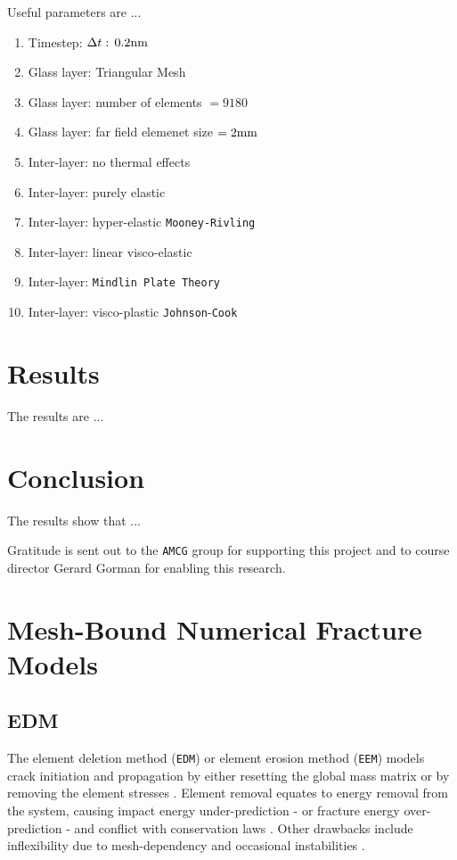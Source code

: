 \documentclass[format=acmsmall, 12pt, screen=true, review=false]{acmart}
\begin{document}
Useful parameters are ...
\begin{enumerate}
    \item Timestep: $\Delta t:\,0.2\rm{nm}$ \cite{Che18}
    \item Glass layer: Triangular Mesh \cite{Che18}
    \item Glass layer: number of elements $=9180$ \cite{Che18}
    \item Glass layer: far field elemenet size $=2\rm{mm}$ \cite{Che18}
    \item Inter-layer: no thermal effects \cite{Che18}
    \item Inter-layer: purely elastic \cite{Che18, Ji98}
    \item Inter-layer: hyper-elastic \texttt{Mooney-Rivling} \cite{Che16}
    \item Inter-layer: linear visco-elastic \cite{Flo98}
    \item Inter-layer: \texttt{Mindlin Plate Theory} \cite{Yua17, ElS18}
    \item Inter-layer: visco-plastic \texttt{Johnson}-\texttt{Cook} \cite{Xu11, Gao14}
\end{enumerate}

\section{Results}

The results are ...

\section{Conclusion}

The results show that ...

\begin{acks}
Gratitude is sent out to the \texttt{AMCG} group for supporting this project and to course director Gerard Gorman for enabling this research.
\end{acks}


\setlength{\bibsep}{5.0pt}


\appendix

\section{Mesh-Bound Numerical Fracture Models}

\subsection{EDM}
The element deletion method (\texttt{EDM}) or element erosion method (\texttt{EEM}) models crack initiation and propagation by either resetting the global mass matrix or by removing the element stresses \cite{Wan18, Liu16, Pel16}. Element removal equates to energy removal from the system, causing impact energy under-prediction \cite{Alt17, Ved17} - or fracture energy over-prediction \cite{Pel16} - and conflict with conservation laws \cite{Pel16}. Other drawbacks include inflexibility due to mesh-dependency and occasional instabilities \cite{Pel16}.
\end{document}
